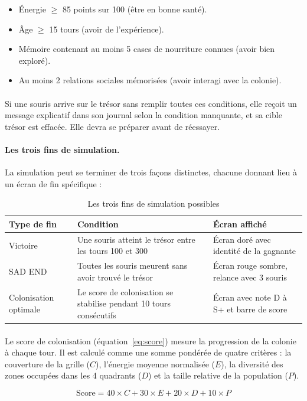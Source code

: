 \begin{itemize}
    \item Énergie $\geq$ 85 points sur 100 (être en bonne santé).
    \item Âge $\geq$ 15 tours (avoir de l'expérience).
    \item Mémoire contenant au moins 5 cases de nourriture connues (avoir bien exploré).
    \item Au moins 2 relations sociales mémorisées (avoir interagi avec la colonie).
\end{itemize}

\paragraph{} Si une souris arrive sur le trésor sans remplir toutes ces conditions, elle reçoit un message explicatif dans son journal selon la condition manquante, et sa cible trésor est effacée. Elle devra se préparer avant de réessayer.

\paragraph{Les trois fins de simulation.} La simulation peut se terminer de trois façons distinctes, chacune donnant lieu à un écran de fin spécifique :

\begin{table}[h!]
\centering
\renewcommand{\arraystretch}{1.5}
\begin{tabular}{|l|p{4.5cm}|p{4.5cm}|}
\hline
\textbf{Type de fin} & \textbf{Condition} & \textbf{Écran affiché} \\
\hline
Victoire & Une souris atteint le trésor entre les tours 100 et 300 & Écran doré avec identité de la gagnante \\
\hline
SAD END & Toutes les souris meurent sans avoir trouvé le trésor & Écran rouge sombre, relance avec 3 souris \\
\hline
Colonisation optimale & Le score de colonisation se stabilise pendant 10 tours consécutifs & Écran avec note D à S+ et barre de score \\
\hline
\end{tabular}
\caption{Les trois fins de simulation possibles}
\label{tab:fins}
\end{table}

\paragraph{} Le score de colonisation (équation~\ref{eq:score}) mesure la progression de la colonie à chaque tour. Il est calculé comme une somme pondérée de quatre critères : la couverture de la grille ($C$), l'énergie moyenne normalisée ($E$), la diversité des zones occupées dans les 4 quadrants ($D$) et la taille relative de la population ($P$).

\begin{equation}
\text{Score} = 40 \times C + 30 \times E + 20 \times D + 10 \times P
\label{eq:score}
\end{equation}
